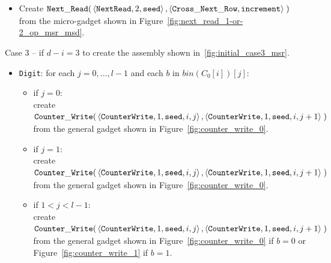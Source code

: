 \begin{itemize}
    \item Create
    $\begin{aligned}[t]
        {\tt Next\_Read}(& \left\langle {\tt NextRead}, 2,      {\tt seed}      \right\rangle,
                    \left\langle {\tt Cross\_Next\_Row}, {\tt increment} \right\rangle \;)
    \end{aligned}$\\from the micro-gadget shown in Figure~\ref{fig:next_read_1-or-2_op_msr_msd}.
\end{itemize}



Case 3 -- if $d - i = 3$ to create the assembly shown in~\ref{fig:initial_case3_msr}.
\begin{itemize}

    \item {\tt Digit}: for each $j=0,\ldots,l-1$ and each $b$ in $bin(C_0[i])[j]$:
    \begin{itemize}
        \item if $j = 0$:\\ create
        $\begin{aligned}[t]
            {\tt Counter\_Write}(&\left\langle {\tt CounterWrite}, 1, {\tt seed}, i, j \right\rangle, \left\langle {\tt CounterWrite}, 1, {\tt seed}, i, j + 1 \right\rangle \;)
        \end{aligned}$\\from the general gadget shown in Figure~\ref{fig:counter_write_0}.

        \item if $j = 1$:\\ create
        $\begin{aligned}[t]
            {\tt Counter\_Write}(&\left\langle {\tt CounterWrite}, 1, {\tt seed}, i, j \right\rangle, \left\langle {\tt CounterWrite}, 1, {\tt seed}, i, j + 1 \right\rangle \;)
        \end{aligned}$\\from the general gadget shown in Figure~\ref{fig:counter_write_0}.

        \item if $1 < j < l-1$:\\ create
        $\begin{aligned}[t]
            {\tt Counter\_Write}(&\left\langle {\tt CounterWrite}, 1, {\tt seed}, i, j \right\rangle, \left\langle {\tt CounterWrite}, 1, {\tt seed}, i, j + 1 \right\rangle \;)
        \end{aligned}$\\from the general gadget shown in Figure~\ref{fig:counter_write_0} if $b = 0$ or Figure~\ref{fig:counter_write_1} if $b = 1$.


\end{itemize}
\end{itemize}
